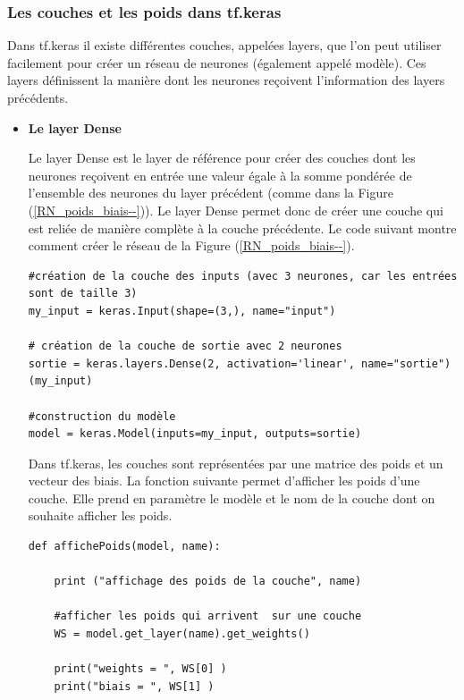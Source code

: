 \subsubsection{Les couches et les poids dans tf.keras}
\label{couche_poids_tfkeras}
Dans tf.keras il existe différentes couches, appelées layers, que l'on peut utiliser facilement pour créer un réseau de neurones (également appelé modèle). Ces layers définissent la manière dont les neurones reçoivent l'information des layers précédents. 
\begin{itemize}[label=$\square$]
\item \textbf{Le layer Dense}

Le layer Dense est le layer de référence pour créer des couches dont les neurones reçoivent en entrée une valeur égale à la somme pondérée de l'ensemble des neurones du layer précédent (comme dans la Figure (\ref{RN_poids_biais--})). Le layer Dense permet donc de créer une couche qui est reliée de manière complète à la couche précédente. 
Le code suivant montre comment créer le réseau de la Figure (\ref{RN_poids_biais--}).
\begin{lstlisting}
#création de la couche des inputs (avec 3 neurones, car les entrées sont de taille 3)
my_input = keras.Input(shape=(3,), name="input") 

# création de la couche de sortie avec 2 neurones
sortie = keras.layers.Dense(2, activation='linear', name="sortie")(my_input)

#construction du modèle
model = keras.Model(inputs=my_input, outputs=sortie)

\end{lstlisting}
Dans tf.keras, les couches sont représentées par une matrice des poids et un vecteur des biais. 
La fonction suivante permet d'afficher les poids d'une couche. Elle prend en paramètre le modèle et le nom de la couche dont on souhaite afficher les poids.
\begin{lstlisting}
def affichePoids(model, name):

	print ("affichage des poids de la couche", name)

	#afficher les poids qui arrivent  sur une couche
	WS = model.get_layer(name).get_weights()

	print("weights = ", WS[0] )
	print("biais = ", WS[1] )


\end{lstlisting}
\end{itemize}
